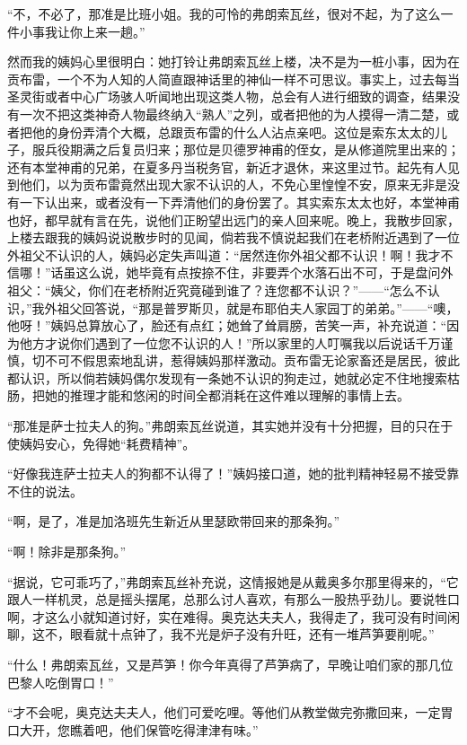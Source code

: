 \par “不，不必了，那准是比班小姐。我的可怜的弗朗索瓦丝，很对不起，为了这么一件小事我让你上来一趟。”
\par 然而我的姨妈心里很明白：她打铃让弗朗索瓦丝上楼，决不是为一桩小事，因为在贡布雷，一个不为人知的人简直跟神话里的神仙一样不可思议。事实上，过去每当圣灵街或者中心广场骇人听闻地出现这类人物，总会有人进行细致的调查，结果没有一次不把这类神奇人物最终纳入“熟人”之列，或者把他的为人摸得一清二楚，或者把他的身份弄清个大概，总跟贡布雷的什么人沾点亲吧。这位是索东太太的儿子，服兵役期满之后复员归来；那位是贝德罗神甫的侄女，是从修道院里出来的；还有本堂神甫的兄弟，在夏多丹当税务官，新近才退休，来这里过节。起先有人见到他们，以为贡布雷竟然出现大家不认识的人，不免心里惶惶不安，原来无非是没有一下认出来，或者没有一下弄清他们的身份罢了。其实索东太太也好，本堂神甫也好，都早就有言在先，说他们正盼望出远门的亲人回来呢。晚上，我散步回家，上楼去跟我的姨妈说说散步时的见闻，倘若我不慎说起我们在老桥附近遇到了一位外祖父不认识的人，姨妈必定失声叫道：“居然连你外祖父都不认识！啊！我才不信哪！”话虽这么说，她毕竟有点按捺不住，非要弄个水落石出不可，于是盘问外祖父：“姨父，你们在老桥附近究竟碰到谁了？连您都不认识？”——“怎么不认识，”我外祖父回答说，“那是普罗斯贝，就是布耶伯夫人家园丁的弟弟。”——“噢，他呀！”姨妈总算放心了，脸还有点红；她耸了耸肩膀，苦笑一声，补充说道：“因为他方才说你们遇到了一位您不认识的人！”所以家里的人叮嘱我以后说话千万谨慎，切不可不假思索地乱讲，惹得姨妈那样激动。贡布雷无论家畜还是居民，彼此都认识，所以倘若姨妈偶尔发现有一条她不认识的狗走过，她就必定不住地搜索枯肠，把她的推理才能和悠闲的时间全都消耗在这件难以理解的事情上去。
\par “那准是萨士拉夫人的狗。”弗朗索瓦丝说道，其实她并没有十分把握，目的只在于使姨妈安心，免得她“耗费精神”。
\par “好像我连萨士拉夫人的狗都不认得了！”姨妈接口道，她的批判精神轻易不接受靠不住的说法。
\par “啊，是了，准是加洛班先生新近从里瑟欧带回来的那条狗。”
\par “啊！除非是那条狗。”
\par “据说，它可乖巧了，”弗朗索瓦丝补充说，这情报她是从戴奥多尔那里得来的，“它跟人一样机灵，总是摇头摆尾，总那么讨人喜欢，有那么一股热乎劲儿。要说牲口啊，才这么小就知道讨好，实在难得。奥克达夫夫人，我得走了，我可没有时间闲聊，这不，眼看就十点钟了，我不光是炉子没有升旺，还有一堆芦笋要削呢。”
\par “什么！弗朗索瓦丝，又是芦笋！你今年真得了芦笋病了，早晚让咱们家的那几位巴黎人吃倒胃口！”
\par “才不会呢，奥克达夫夫人，他们可爱吃哩。等他们从教堂做完弥撒回来，一定胃口大开，您瞧着吧，他们保管吃得津津有味。”
